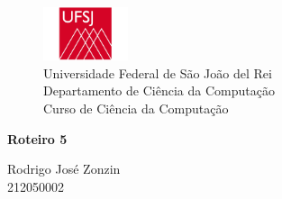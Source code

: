 \begin{figure}[t]
	\centering
	\includegraphics[width=2.5cm]{ufsj}\\
	
	{\large Universidade Federal de São João del Rei\\
		Departamento de Ciência da Computação\\
		Curso de Ciência da Computação\\}
	\label{fig:ufsj}
\end{figure}
{\Large
	\begin{center}
		\textbf{Roteiro 5}
		
	\end{center}
}

{\large 
	
	\begin{center}
		Rodrigo José Zonzin \\
		212050002
	\end{center}	
}